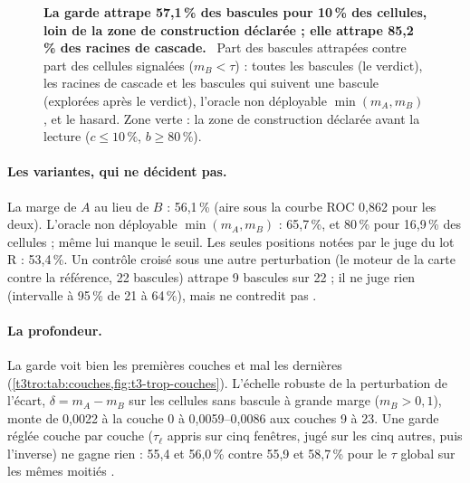 \begin{figure}[tbp]
\centering
\GrapheTropicaleCourbe
\caption[La courbe de la garde tropicale]{\textbf{La garde attrape 57,1\,\% des bascules pour 10\,\% des cellules, loin de la zone de construction déclarée ; elle attrape 85,2\,\% des racines de cascade.} \mes~Part des bascules attrapées contre part des cellules signalées ($m_B < \tau$) : toutes les bascules (le verdict), les racines de cascade et les bascules qui suivent une bascule (explorées après le verdict), l'oracle non déployable $\min(m_A, m_B)$, et le hasard. Zone verte : la zone de construction déclarée avant la lecture ($c \le 10\,\%$, $b \ge 80\,\%$). }
\label{fig:t3-trop-courbe}
\end{figure}

\paragraph{Les variantes, qui ne décident pas.} La marge de $A$ au lieu de $B$ : 56,1\,\% (aire sous la courbe ROC 0,862 pour les deux). L'oracle non déployable $\min(m_A, m_B)$ : 65,7\,\%, et 80\,\% pour 16,9\,\% des cellules ; même lui manque le seuil. Les seules positions notées par le juge du lot R : 53,4\,\%. Un contrôle croisé sous une autre perturbation (le moteur de la carte contre la référence, 22 bascules) attrape 9 bascules sur 22 ; il ne juge rien (intervalle à 95\,\% de 21 à 64\,\%), mais ne contredit pas \mes.

\paragraph{La profondeur.} La garde voit bien les premières couches et mal les dernières (\cref{t3tro:tab:couches,fig:t3-trop-couches}). L'échelle robuste de la perturbation de l'écart, $\delta = m_A - m_B$ sur les cellules sans bascule à grande marge ($m_B > 0{,}1$), monte de 0,0022 à la couche 0 à 0,0059--0,0086 aux couches 9 à 23. Une garde réglée couche par couche ($\tau_\ell$ appris sur cinq fenêtres, jugé sur les cinq autres, puis l'inverse) ne gagne rien : 55,4 et 56,0\,\% contre 55,9 et 58,7\,\% pour le $\tau$ global sur les mêmes moitiés \mes.

